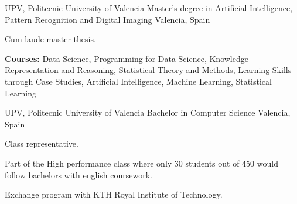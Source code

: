 

\begin{cventries}

  \cventry
    {UPV, Politecnic University of Valencia} %
    {Master’s degree in Artificial Intelligence, Pattern
Recognition and Digital Imaging} %
    {Valencia, Spain} %
    {}
    {
      \begin{cvitems} %
        \item {Cum laude master thesis.}
        \item {\textbf{Courses:} Data Science, Programming for Data Science, Knowledge Representation and Reasoning, Statistical Theory and Methods, Learning Skills through Case Studies, Artificial Intelligence, Machine Learning, Statistical Learning}
      \end{cvitems}
    }
    
  \cventry
    {UPV, Politecnic University of Valencia} %
    {Bachelor in Computer Science} %
    {Valencia, Spain} %
    {}
    {
      \begin{cvitems} %
        \item {Class representative.}
        \item {Part of the High performance class where only 30 students out of 450 would follow bachelors with english coursework.}
        \item {Exchange program with KTH Royal Institute of Technology.}
      \end{cvitems}
    }
\end{cventries}
